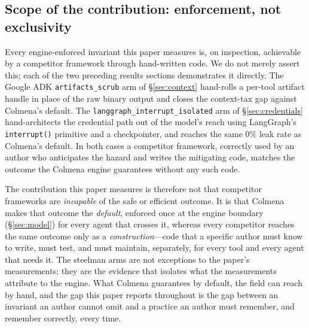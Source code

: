 \subsection{Scope of the contribution: enforcement, not exclusivity}
\label{subsec:limitations-caveat}

Every engine-enforced invariant this paper measures is, on inspection,
achievable by a competitor framework through hand-written code. We do not
merely assert this; each of the two preceding results sections
demonstrates it directly. The Google ADK \texttt{artifacts\_scrub} arm of
\S\ref{sec:context} hand-rolls a per-tool artifact handle in place of the
raw binary output and closes the context-tax gap against Colmena's
default. The \texttt{langgraph\_interrupt\_isolated} arm of
\S\ref{sec:credentials} hand-architects the credential path out of the
model's reach using LangGraph's \texttt{interrupt()} primitive and a
checkpointer, and reaches the same $0\%$ leak rate as Colmena's default.
In both cases a competitor framework, correctly used by an author who
anticipates the hazard and writes the mitigating code, matches the
outcome the Colmena engine guarantees without any such code.

The contribution this paper measures is therefore not that competitor
frameworks are \emph{incapable} of the safe or efficient outcome. It is
that Colmena makes that outcome the \emph{default}, enforced once at the
engine boundary (\S\ref{sec:model}) for every agent that crosses it,
whereas every competitor reaches the same outcome only as a
\emph{construction}---code that a specific author must know to write,
must test, and must maintain, separately, for every tool and every agent
that needs it. The steelman arms are not exceptions to the
paper's measurements; they are the evidence that isolates what the
measurements attribute to the engine. What Colmena guarantees by default,
the field can reach by hand, and the gap this paper reports throughout is
the gap between an invariant an author cannot omit and a practice an
author must remember, and remember correctly, every time.

